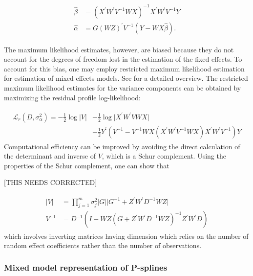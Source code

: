 \documentclass[12pt]{article}
\theoremstyle{definition}
\begin{document}
\begin{align} \label{eq:mm-coefficient-mles}
\begin{split}
\hat{\beta} &= \left( X^\prime W^\prime V^{-1}WX \right)^{-1}X^\prime W^\prime V^{-1} Y \\
\hat{\alpha} &= G\left( W Z \right)^\prime V^{-1} \left( Y-WX\hat{\beta} \right).
\end{split}
\end{align}

The maximum likelihood estimates, however, are biased because they do not account for the degrees of freedom lost in the estimation of the fixed effects. To account for this bias, one may employ restricted maximum likelihood estimation for estimation of mixed effects models. See \citet{schall1991estimation} for a detailed overview. The restricted maximum likelihood estimates for the variance components can be obtained by maximizing the residual profile log-likelihood:

\begin{align}
\begin{split} \label{eq:mm-restricted-log-likelihood}
\mathcal{L}_r \left( D , \sigma_\alpha^2 \right) =  -\frac{1}{2} \log\vert V \vert  &-\frac{1}{2} \log\vert X^\prime W^\prime V WX \vert \\
 &- \frac{1}{2} Y^\prime \left( V^{-1} - V^{-1}WX \left(X^\prime W^\prime V^{-1}WX \right)X^\prime W^\prime V^{-1} \right) Y
\end{split}
\end{align}
\noindent
Computational efficiency can be improved by avoiding the direct calculation of the determinant and inverse of $V$, which is a Schur complement. Using the properties of the Schur complement, one can show that 

[THIS NEEDS CORRECTED]

\begin{align}
\begin{split}
\vert V \vert &=  \prod_{j=1}^m \sigma_j^2 \vert G \vert  \vert G^{-1} + Z^\prime W^\prime D^{-1}WZ \vert \\
V^{-1} &= D^{-1} \left( I - WZ\left( G + Z^\prime W^\prime D^{-1} W Z \right)^{-1} Z^\prime W^\prime D  \right) 
\end{split}
\end{align}
\noindent 
which involves inverting matrices having dimension which relies on the number of random effect coefficients rather than the number of observations. 


\subsubsection{Mixed model representation of P-splines}
\end{document}
